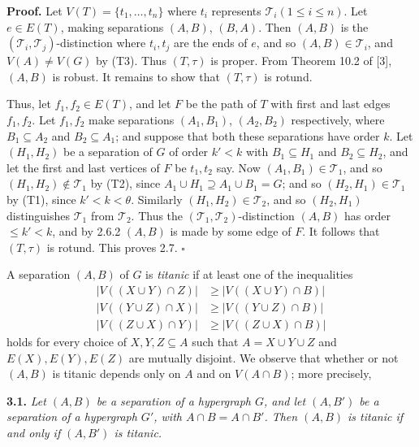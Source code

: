 \textbf{Proof.} Let $V(T) = \{t_1, \dots, t_n\}$ where $t_i$ represents $\mathscr{T}_i (1 \le i \le n)$. Let $e \in E(T)$, making separations $(A, B)$, $(B, A)$. Then $(A, B)$ is the $(\mathscr{T}_i, \mathscr{T}_j)$-distinction where $t_i, t_j$ are the ends of $e$, and so $(A, B) \in \mathscr{T}_i$, and $V(A) \ne V(G)$ by (T3). Thus $(T, \tau)$ is proper. From Theorem 10.2 of [3], $(A, B)$ is robust. It remains to show that $(T, \tau)$ is rotund.

Thus, let $f_1, f_2 \in E(T)$, and let $F$ be the path of $T$ with first and last edges $f_1, f_2$. Let $f_1, f_2$ make separations $(A_1, B_1)$, $(A_2, B_2)$ respectively, where $B_1 \subseteq A_2$ and $B_2 \subseteq A_1$; and suppose that both these separations have order $k$. Let $(H_1, H_2)$ be a separation of $G$ of order $k' < k$ with $B_1 \subseteq H_1$ and $B_2 \subseteq H_2$, and let the first and last vertices of $F$ be $t_1, t_2$ say. Now $(A_1, B_1) \in \mathscr{T}_1$, and so $(H_1, H_2) \notin \mathscr{T}_1$ by (T2), since $A_1 \cup H_1 \supseteq A_1 \cup B_1 = G$; and so $(H_2, H_1) \in \mathscr{T}_1$ by (T1), since $k' < k < \theta$. Similarly $(H_1, H_2) \in \mathscr{T}_2$, and so $(H_2, H_1)$ distinguishes $\mathscr{T}_1$ from $\mathscr{T}_2$. Thus the $(\mathscr{T}_1, \mathscr{T}_2)$-distinction $(A, B)$ has order $\le k' < k$, and by 2.6.2 $(A, B)$ is made by some edge of $F$. It follows that $(T, \tau)$ is rotund. This proves 2.7. $\square$


A separation $(A, B)$ of $G$ is \textit{titanic} if at least one of the inequalities
\begin{align*}
|V((X \cup Y) \cap Z)| &\ge |V((X \cup Y) \cap B)| \\
|V((Y \cup Z) \cap X)| &\ge |V((Y \cup Z) \cap B)| \\
|V((Z \cup X) \cap Y)| &\ge |V((Z \cup X) \cap B)|
\end{align*}
holds for every choice of $X, Y, Z \subseteq A$ such that $A = X \cup Y \cup Z$ and $E(X), E(Y), E(Z)$ are mutually disjoint. We observe that whether or not $(A, B)$ is titanic depends only on $A$ and on $V(A \cap B)$; more precisely,

\textbf{3.1.} \textit{Let $(A, B)$ be a separation of a hypergraph $G$, and let $(A, B')$ be a separation of a hypergraph $G'$, with $A \cap B = A \cap B'$. Then $(A, B)$ is titanic if and only if $(A, B')$ is titanic.}

